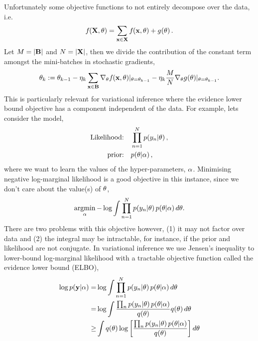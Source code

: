 \documentclass[11pt, oneside]{article}
\begin{document}
Unfortunately some objective functions to not entirely decompose over the data,
i.e. 
\begin{equation}
    {f}_{}\!\left({{\mathbf{X}, \theta}}\right) = \sum_{\mathbf{x} \in \mathbf{X}} {f}_{}\!\left({{\mathbf{x}, \theta}}\right)
    + {g}_{}\!\left({{\theta}}\right).
    \label{eq:objwconst}
\end{equation}
Let $M = |\mathbf{B}|$ and $N = |\mathbf{X}|$, then we divide the contribution of the
constant term amongst the mini-batches in stochastic gradients,
\begin{equation}
    \theta_k := \theta_{k-1} - \eta_k \sum_{\mathbf{x} \in \mathbf{B}}
    \nabla_{\theta} {f}_{}\!\left({{\mathbf{x}, \theta}}\right)\!|_{\theta = \theta_{k-1}}
    - \eta_k \frac{M}{N} \nabla_{\theta} 
    {g}_{}\!\left({{\theta}}\right)\!|_{\theta = \theta_{k-1}}.
    \label{eq:wsg}
\end{equation} 
This is particularly relevant for variational inference where the evidence
lower bound objective has a component independent of the data. For example, 
lets consider the model,
\begin{align}
    \text{Likelihood:} \quad &\prod^N_{n=1} p\!\left({y_n}\middle\vert{\ensuremath{\theta}}\right), \\
    \text{prior:} \quad &p\!\left({\theta}\middle\vert{\ensuremath{\alpha}}\right),
\end{align}
where we want to learn the values of the hyper-parameters, $\alpha$. Minimising
negative log-marginal likelihood is a good objective in this instance, since we
don't care about the value(s) of $\theta$,
\begin{equation}
    \operatorname*{\operatorname*{argmin}}_{\alpha} - \log \int \prod^N_{n=1} p\!\left({y_n}\middle\vert{\ensuremath{\theta}}\right)
    p\!\left({\theta}\middle\vert{\ensuremath{\alpha}}\right) d \theta.
    \label{eq:lml}
\end{equation}
There are two problems with this objective however, (1) it may not factor over
data and (2) the integral may be intractable, for instance, if the prior and
likelihood are not conjugate. In variational inference we use Jensen's
inequality to lower-bound log-marginal likelihood with a tractable objective
function called the evidence lower bound (ELBO),
\begin{align}
    \log \probC{\targ}{\hyper} =& \log \int 
        \prod^N_{n=1} \probC{\targs_n}{\param} 
        \probC{\param}{\hyper} d \param \nonumber \\
        =& \log \int 
        \frac{\prod_n \probC{\targs_n}{\param} \probC{\param}{\hyper}}
        {\qrob{\param}} \qrob{\param} d \param \nonumber \\
        \geq& \int \qrob{\param} \log \sbrac{%
            \frac{\prod_n \probC{\targs_n}{\param} 
            \probC{\param}{\hyper}}{\qrob{\param}}}
        d \param
\end{align}
\end{document}
